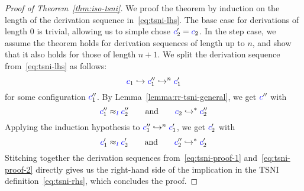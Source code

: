 \documentclass{sigplanconf}
\newcommand{\Varid}[1]{\mathit{#1}}
\begin{document}
\begin{proof}[Proof of Theorem~\ref{thm:iso-tsni}]
  We proof the theorem by induction on the length of the derivation sequence in~\eqref{eq:tsni-lhs}.
  The base case for derivations
  of length 0 is trivial, allowing
  us to simple chose ${\color{blue} c}_{2}'\mathrel{=}{\color{blue} c}_{2}$.  In the step case, we assume
  the theorem holds for derivation sequences of length up to $n$, and show that it also
  holds for those of length $n+1$.  We split the derivation sequence from~\eqref{eq:tsni-lhs} as follows:
  \[
  {\color{blue} c}_{1} \hookrightarrow {\color{blue} c}_{1}'' \hookrightarrow^n {\color{blue} c}_{1}'
  \]
  for some configuration \ensuremath{\ifc{c}_{1}''}.  By Lemma~\ref{lemma:rr-tsni-general}, we get
  \ensuremath{\ifc{c}''} with
  \begin{equation} \label{eq:tsni-proof-1}
  \ensuremath{\ifc{c}_{1}''} \approx_{\ensuremath{\ifc{\Varid{l}}}} \ensuremath{\ifc{c}_{2}''}
  \qquad \text{and} \qquad
  \ensuremath{\ifc{c}_{2}} \ensuremath{\hookrightarrow}^* \ensuremath{\ifc{c}_{2}''}
  \end{equation}
  Applying the induction hypothesis to
  ${\color{blue} c}_{1}'' \hookrightarrow^n {\color{blue} c}_{1}'$, we get \ensuremath{\ifc{c}_{2}'} with
  \begin{equation} \label{eq:tsni-proof-2}
  \ensuremath{\ifc{c}_{1}'} \approx_{\ensuremath{\ifc{\Varid{l}}}} \ensuremath{\ifc{c}_{2}'}
  \qquad \text{and} \qquad
  \ensuremath{\ifc{c}_{2}''} \ensuremath{\hookrightarrow}^* \ensuremath{\ifc{c}_{2}'}
  \end{equation}
  Stitching together the derivation sequences from~\eqref{eq:tsni-proof-1} and~\eqref{eq:tsni-proof-2} directly gives
  us the right-hand side of the implication in the TSNI
  definition~\eqref{eq:tsni-rhs}, which concludes the proof.
\end{proof}
\end{document}

